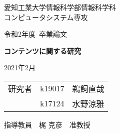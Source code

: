 \thispagestyle{myheadings}

\vspace{-1.0cm}

\begin{center}

{\LARGE 愛知工業大学情報科学部情報科学科\\
コンピュータシステム専攻

\vspace{1.0cm}

令和2年度~卒業論文\\

\vspace{2.0cm}

{\Huge 
\baselineskip=15mm
\textbf{コンテンツに関する研究\\}}

\vspace{7.0cm}

2021年2月\\

\vspace{1.0cm}

\begin{tabular}[h]{lll}
  研究者  & k19017 & 鵜飼直哉\\
         & k17124 & 水野涼雅\\
\end{tabular}

\vspace{1.0cm}

指導教員\ \ 梶 克彦\ \ 准教授}

\end{center}